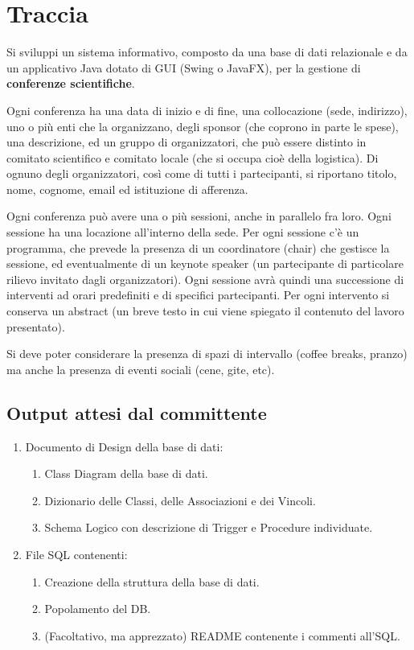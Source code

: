 \section{Traccia}\label{sez:traccia}
Si sviluppi un sistema informativo, composto da una base di dati relazionale e da un applicativo Java dotato
di GUI (Swing o JavaFX), per la gestione di \textbf{conferenze scientifiche}. 
\bigskip

Ogni conferenza ha una data di inizio e di fine, una collocazione (sede, indirizzo), uno o più enti che la organizzano, degli sponsor (che coprono in parte le spese), una descrizione, ed un gruppo di organizzatori, che può essere distinto in comitato scientifico e comitato locale (che si occupa cioè della logistica). Di ognuno degli organizzatori, così come di tutti i partecipanti, si riportano titolo, nome, cognome, email ed istituzione di afferenza. 
\bigskip

Ogni conferenza può avere una o più sessioni, anche in parallelo fra loro. Ogni sessione ha una locazione all'interno della sede. Per ogni
sessione c'è un programma, che prevede la presenza di un coordinatore (chair) che gestisce la sessione, ed eventualmente di un keynote speaker (un partecipante di particolare rilievo invitato dagli organizzatori). Ogni sessione avrà quindi una successione di interventi ad orari predefiniti e di specifici partecipanti. Per ogni intervento si conserva un abstract (un breve testo in cui viene spiegato il contenuto del lavoro presentato).
\bigskip

Si deve poter considerare la presenza di spazi di intervallo (coffee breaks, pranzo) ma anche la presenza di eventi sociali (cene, gite, etc).
\subsection{Output attesi dal committente}
\begin{enumerate}
\item Documento di Design della base di dati:
\begin{enumerate}
\item Class Diagram della base di dati.
\item Dizionario delle Classi, delle Associazioni e dei Vincoli.
\item Schema Logico con descrizione di Trigger e Procedure individuate.
\end{enumerate}
\item File SQL contenenti:
\begin{enumerate}
\item Creazione della struttura della base di dati.
\item Popolamento del DB.
\item (Facoltativo, ma apprezzato) README contenente i commenti all’SQL.
\end{enumerate}
\end{enumerate}
